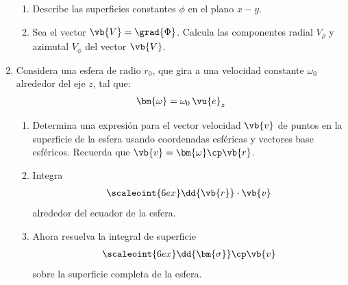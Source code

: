 \begin{enumerate}
\begin{enumerate}[label=\roman*)]
\item Describe las superficies constantes $\phi$ en el plano $x-y$.
\item Sea el vector $\vb{V} = \grad{\Phi}$. Calcula las componentes radial $V_{\rho}$ y azimutal $V_{\phi}$ del vector $\vb{V}$.
\end{enumerate} 
\item Considera una esfera de radio $r_{0}$, que gira a una velocidad constante $\omega_{0}$ alrededor del eje $z$, tal que:
\begin{align*}
\bm{\omega} = \omega_{0} \, \vu{e}_{z}
\end{align*}
\begin{enumerate}[label=\alph*)]
\item Determina una expresión para el vector velocidad $\vb{v}$ de puntos en la superficie de la esfera usando coordenadas esféricas y vectores base esféricos. Recuerda que $\vb{v} = \bm{\omega} \cp \vb{r}$.
\item Integra
\begin{align*}
\scaleoint{6ex} \dd{\vb{r}} \cdot \vb{v}
\end{align*}
alrededor del ecuador de la esfera.
\item Ahora resuelva la integral de superficie
\begin{align*}
\scaleoint{6ex} \dd{\bm{\sigma}} \cp \vb{v}
\end{align*}
sobre la superficie completa de la esfera.
\end{enumerate}


\end{enumerate}
